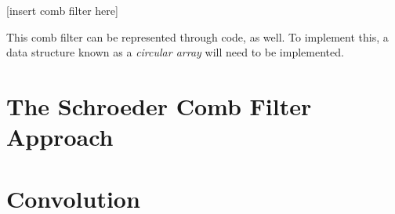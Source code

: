 [insert comb filter here]


This comb filter can be represented through code, as well. To implement this, a data structure known as a \textit{circular array} will need to be implemented.

\section{The Schroeder Comb Filter Approach}





\section{Convolution}
